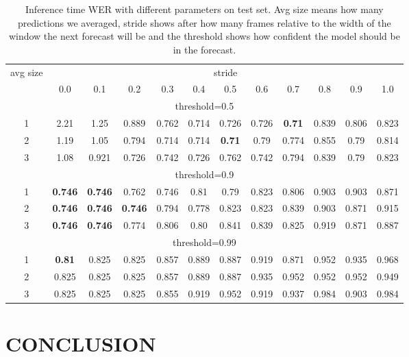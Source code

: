 \documentclass[]{spie}
\begin{document}
\begin{table}[!ht]
\caption{\label{tab:optimal-parameters} Inference time WER with different parameters on test set.  
{Avg size} means how many predictions we averaged, stride shows after how many frames relative to the width of the window the next forecast will be and the threshold shows how confident the model should be in the forecast.}
\begin{center}
\begin{tabular}{|c|c|c|c|c|c|c|c|c|c|c|c|}
\hline
\multirow{2}{*}{avg size} & \multicolumn{11}{|c|}{stride}\\
\cline{2-12}
&0.0&0.1&0.2&0.3&0.4&0.5&0.6&0.7&0.8&0.9&1.0\\
\hline
\multicolumn{12}{|c|}{threshold=0.5}\\
\hline
1&2.21&1.25&0.889&0.762&0.714&0.726&0.726&\textbf{0.71}&0.839&0.806&0.823\\
2&1.19&1.05&0.794&0.714&0.714&\textbf{0.71}&0.79&0.774&0.855&0.79&0.814\\
3&1.08&0.921&0.726&0.742&0.726&0.762&0.742&0.794&0.839&0.79&0.823\\

\hline
\multicolumn{12}{|c|}{threshold=0.9}\\
\hline
1&\textbf{0.746}&\textbf{0.746}&0.762&0.746&0.81&0.79&0.823&0.806&0.903&0.903&0.871\\
2&\textbf{0.746}&\textbf{0.746}&\textbf{0.746}&0.794&0.778&0.823&0.823&0.839&0.903&0.871&0.915\\
3&\textbf{0.746}&\textbf{0.746}&0.774&0.806&0.80&0.841&0.839&0.825&0.919&0.871&0.887\\

\hline
\multicolumn{12}{|c|}{threshold=0.99}\\
\hline
1&\textbf{0.81}&0.825&0.825&0.857&0.889&0.887&0.919&0.871&0.952&0.935&0.968\\
2&0.825&0.825&0.825&0.857&0.889&0.887&0.935&0.952&0.952&0.952&0.949\\
3&0.825&0.825&0.825&0.855&0.919&0.952&0.919&0.937&0.984&0.903&0.984\\
\hline
\end{tabular}
\end{center}
\end{table}





\section{CONCLUSION}
\end{document}
